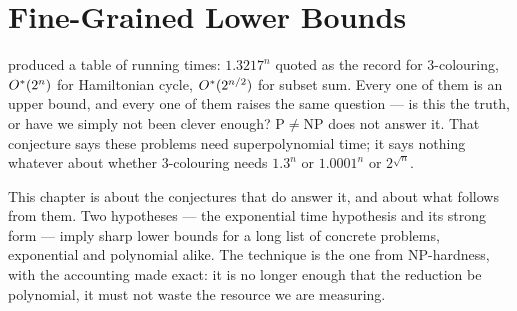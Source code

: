 
\chapter{Fine-Grained Lower Bounds}
\label{ch:lower-bounds}

 produced a table of running times: $1.3217^n$
quoted as the record for
$3$-colouring, $O^{*}{}(2^n)$ for Hamiltonian cycle, $O^{*}{}(2^{n/2})$ for
subset sum. Every one of them is an upper bound, and every one of them raises
the same question --- is this the truth, or have we simply not been clever
enough? $\mathrm{P} \ne \mathrm{NP}$ does not answer it. That conjecture says
these problems need superpolynomial time; it says nothing whatever about
whether $3$-colouring needs $1.3^n$ or $1.0001^n$ or $2^{\sqrt n}$.

This chapter is about the conjectures that do answer it, and about what follows
from them. Two hypotheses --- the exponential time hypothesis and its strong
form --- imply sharp lower bounds for a long list of concrete problems,
exponential and polynomial alike. The technique is the one from
\textrm{NP}-hardness, with the accounting made exact: it is no longer enough
that the reduction be polynomial, it must not waste the resource we are
measuring.

